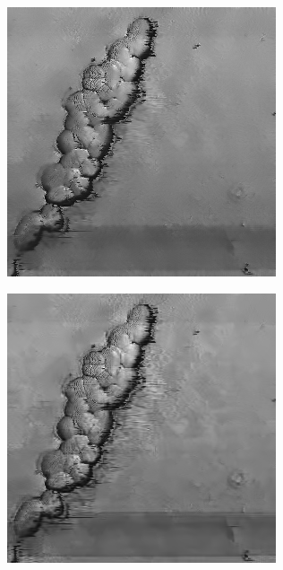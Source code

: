 \documentclass[../main.tex]{subfiles}
\begin{document}
\begin{figure}[!ht]
\begin{subfigure}{0.3\linewidth}
		\includegraphics[keepaspectratio, width=\linewidth]{images/ef_o2a_nlm.png}
	\end{subfigure}
	\hfill
	\begin{subfigure}{0.3\linewidth}
		\centering
		\includegraphics[keepaspectratio, width=\linewidth]{images/ef_o2a_bm3d.png}

\end{subfigure}
\end{figure}
\end{document}
